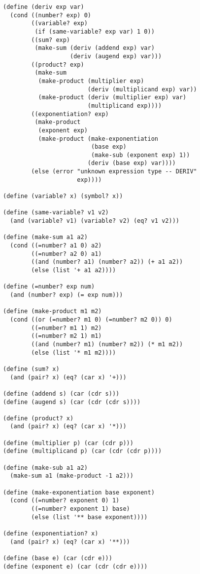 \documentclass[a4paper,12pt]{article}
\begin{document}
\begin{lstlisting}
(define (deriv exp var)
  (cond ((number? exp) 0)
        ((variable? exp)
         (if (same-variable? exp var) 1 0))
        ((sum? exp)
         (make-sum (deriv (addend exp) var)
                   (deriv (augend exp) var)))
        ((product? exp)
         (make-sum
          (make-product (multiplier exp)
                        (deriv (multiplicand exp) var))
          (make-product (deriv (multiplier exp) var)
                        (multiplicand exp))))
        ((exponentiation? exp)
         (make-product
          (exponent exp)
          (make-product (make-exponentiation
                         (base exp)
                         (make-sub (exponent exp) 1))
                        (deriv (base exp) var))))
        (else (error "unknown expression type -- DERIV"
                     exp))))

(define (variable? x) (symbol? x))

(define (same-variable? v1 v2)
  (and (variable? v1) (variable? v2) (eq? v1 v2)))

(define (make-sum a1 a2)
  (cond ((=number? a1 0) a2)
        ((=number? a2 0) a1)
        ((and (number? a1) (number? a2)) (+ a1 a2))
        (else (list '+ a1 a2))))

(define (=number? exp num)
  (and (number? exp) (= exp num)))
 
(define (make-product m1 m2)
  (cond ((or (=number? m1 0) (=number? m2 0)) 0)
        ((=number? m1 1) m2)
        ((=number? m2 1) m1)
        ((and (number? m1) (number? m2)) (* m1 m2))
        (else (list '* m1 m2))))

(define (sum? x)
  (and (pair? x) (eq? (car x) '+)))

(define (addend s) (car (cdr s)))
(define (augend s) (car (cdr (cdr s))))

(define (product? x)
  (and (pair? x) (eq? (car x) '*)))

(define (multiplier p) (car (cdr p)))
(define (multiplicand p) (car (cdr (cdr p))))

(define (make-sub a1 a2)
  (make-sum a1 (make-product -1 a2)))

(define (make-exponentiation base exponent)
  (cond ((=number? exponent 0) 1)
        ((=number? exponent 1) base)
        (else (list '** base exponent))))

(define (exponentiation? x)
  (and (pair? x) (eq? (car x) '**)))

(define (base e) (car (cdr e)))
(define (exponent e) (car (cdr (cdr e))))
\end{lstlisting}
\end{document}

